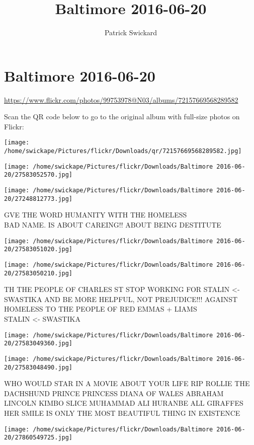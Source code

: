 \documentclass[10pt,letterpaper]{article}
\title{Baltimore 2016-06-20}
\author{Patrick Swickard}
\date{}
\begin{document}
\section*{Baltimore 2016-06-20}

\url{https://www.flickr.com/photos/99753978@N03/albums/72157669568289582}

Scan the QR code below to go to the original album with full-size photos on Flickr:

\texttt{[image: /home/swickape/Pictures/flickr/Downloads/qr/72157669568289582.jpg]}
\pagebreak

\texttt{[image: /home/swickape/Pictures/flickr/Downloads/Baltimore 2016-06-20/27583052570.jpg]}

\vspace{0.25in}
\texttt{[image: /home/swickape/Pictures/flickr/Downloads/Baltimore 2016-06-20/27248812773.jpg]}

GVE THE WORD HUMANITY WITH THE HOMELESS\\
BAD NAME.  IS ABOUT CAREING!! ABOUT BEING DESTITUTE
\pagebreak

\texttt{[image: /home/swickape/Pictures/flickr/Downloads/Baltimore 2016-06-20/27583051020.jpg]}

\vspace{0.25in}
\texttt{[image: /home/swickape/Pictures/flickr/Downloads/Baltimore 2016-06-20/27583050210.jpg]}

TH THE PEOPLE OF CHARLES ST STOP WORKING FOR STALIN <{-} SWASTIKA AND BE MORE HELPFUL, NOT PREJUDICE!!! AGAINST HOMELESS TO THE PEOPLE OF RED EMMAS + LIAMS\\
STALIN <{-} SWASTIKA
\pagebreak

\texttt{[image: /home/swickape/Pictures/flickr/Downloads/Baltimore 2016-06-20/27583049360.jpg]}

\vspace{0.25in}
\texttt{[image: /home/swickape/Pictures/flickr/Downloads/Baltimore 2016-06-20/27583048490.jpg]}

WHO WOULD STAR IN A MOVIE ABOUT YOUR LIFE RIP ROLLIE THE DACHSHUND PRINCE PRINCESS DIANA OF WALES ABRAHAM LINCOLN KIMBO SLICE MUHAMMAD ALI HURANBE ALL GIRAFFES\\
HER SMILE IS ONLY THE MOST BEAUTIFUL THING IN  EXISTENCE
\pagebreak

\texttt{[image: /home/swickape/Pictures/flickr/Downloads/Baltimore 2016-06-20/27860549725.jpg]}
\end{document}

